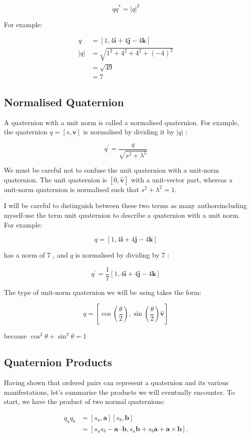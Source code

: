 \documentclass[10pt]{article}
\begin{document}
$$
q q^{*}=|q|^{2}
$$

For example:

$$
\begin{aligned}
q & =[1,4 \mathbf{i}+4 \mathbf{j}-4 \mathbf{k}] \\
|q| & =\sqrt{1^{2}+4^{2}+4^{2}+(-4)^{2}} \\
& =\sqrt{49} \\
& =7
\end{aligned}
$$

\subsection{Normalised Quaternion}
A quaternion with a unit norm is called a normalised quaternion. For example, the quaternion $q=[s, \mathbf{v}]$ is normalised by dividing it by $|q|$ :

$$
q^{\prime}=\frac{q}{\sqrt{s^{2}+\lambda^{2}}}
$$

We must be careful not to confuse the unit quaternion with a unit-norm quaternion. The unit quaternion is $[0, \hat{\mathbf{v}}]$ with a unit-vector part, whereas a unit-norm quaternion is normalised such that $s^{2}+\lambda^{2}=1$.

I will be careful to distinguish between these two terms as many authorsincluding myself-use the term unit quaternion to describe a quaternion with a unit norm. For example:

$$
q=[1,4 \mathbf{i}+4 \mathbf{j}-4 \mathbf{k}]
$$

has a norm of 7 , and $q$ is normalised by dividing by 7 :

$$
q^{\prime}=\frac{1}{7}[1,4 \mathbf{i}+4 \mathbf{j}-4 \mathbf{k}]
$$

The type of unit-norm quaternion we will be using takes the form:

$$
q=\left[\cos \left(\frac{\theta}{2}\right), \sin \left(\frac{\theta}{2}\right) \hat{\mathbf{v}}\right]
$$

because $\cos ^{2} \theta+\sin ^{2} \theta=1$

\subsection{Quaternion Products}
Having shown that ordered pairs can represent a quaternion and its various manifestations, let's summarise the products we will eventually encounter. To start, we have the product of two normal quaternions:

$$
\begin{aligned}
q_{a} q_{b} & =\left[s_{a}, \mathbf{a}\right]\left[s_{b}, \mathbf{b}\right] \\
& =\left[s_{a} s_{b}-\mathbf{a} \cdot \mathbf{b}, s_{a} \mathbf{b}+s_{b} \mathbf{a}+\mathbf{a} \times \mathbf{b}\right] .
\end{aligned}
$$
\end{document}

